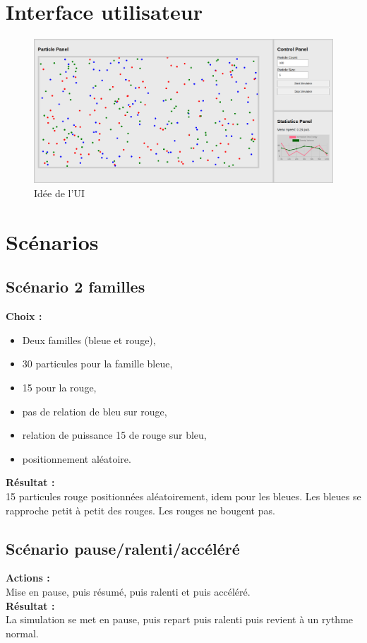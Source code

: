 \documentclass{article}
\begin{document}
\section{Interface utilisateur}
\begin{figure}[h]
    \centering
    \includegraphics[width=1\linewidth]{interface/interface.png}
    \caption{Idée de l'UI}
    \label{fig:Interface1}
\end{figure}
\section{Scénarios}
\subsection{Scénario 2 familles}
\textbf{Choix :}
\begin{itemize}
    \item Deux familles (bleue et rouge),
    \item 30 particules pour la famille bleue,
    \item 15 pour la rouge,
    \item pas de relation de bleu sur rouge,
    \item relation de puissance 15 de rouge sur bleu,
    \item positionnement aléatoire.
\end{itemize}
\indent\textbf{Résultat :} \\
15 particules rouge positionnées aléatoirement, idem pour les bleues. Les bleues se rapproche petit à petit des rouges. Les rouges ne bougent pas.

\newpage
\subsection{Scénario pause/ralenti/accéléré}
\textbf{Actions :} \\
Mise en pause, puis résumé, puis ralenti et puis accéléré. \\
\indent\textbf{Résultat :} \\
La simulation se met en pause, puis repart puis ralenti puis revient à un rythme normal.
\end{document}
